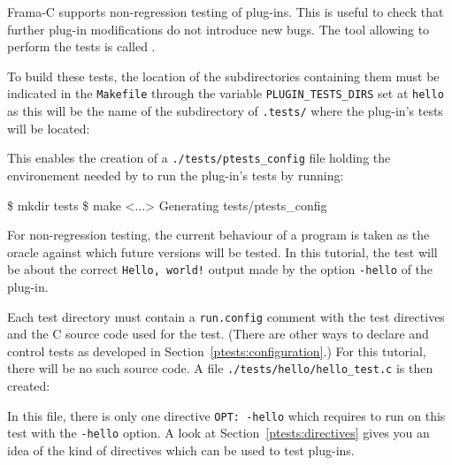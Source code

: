 Frama-C supports non-regression testing of plug-ins. This is useful to check
that further plug-in modifications do not introduce new bugs. The tool allowing
to perform the tests is called \ptests{}.

To build these tests, the location of the subdirectories containing them must
be indicated in the \texttt{Makefile} through the variable
\texttt{PLUGIN\_TESTS\_DIRS} set at
\texttt{hello} as this will be the name of the
subdirectory of \texttt{.tests/} where the plug-in's tests will be located:


This enables the creation of a
\texttt{./tests/ptests\_config} file holding the environement needed by
\ptests to run the plug-in's tests by running:
\begin{shell}
\$ mkdir tests
\$ make
<...>
Generating   tests/ptests_config
\end{shell}

For non-regression testing, the current behaviour of a program is taken as
the oracle against which future versions will be tested. In this tutorial, the
test will be about the correct \texttt{Hello, world!} output made by the option
\texttt{-hello} of the plug-in.

Each test directory must contain a
\texttt{run.config}
comment with the test directives and the C
source code used for the test.
(There are other ways to declare and control tests as developed
in Section~\ref{ptests:configuration}.)
For this tutorial, there will be no such source code. A file
\texttt{./tests/hello/hello\_test.c} is then created:



In this file, there is only one directive
\texttt{OPT: -hello} which requires
to run \framac on this test with the \texttt{-hello} option.
A look at Section~\ref{ptests:directives} gives you an idea of the kind of
directives which can be used to test plug-ins.

